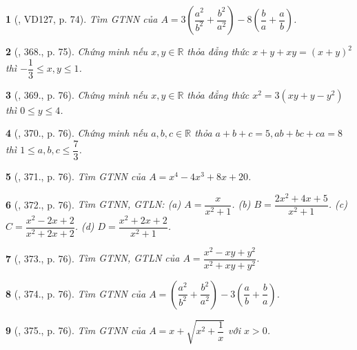 \documentclass{article}
\newtheorem{baitoan}{}
\begin{document}
\begin{baitoan}[\cite{Binh_Toan_9_tap_2}, VD127, p. 74]
	Tìm {\rm GTNN} của $A = 3\left(\dfrac{a^2}{b^2} + \dfrac{b^2}{a^2}\right) - 8\left(\dfrac{b}{a} + \dfrac{a}{b}\right)$.
\end{baitoan}

\begin{baitoan}[\cite{Binh_Toan_9_tap_2}, 368., p. 75]
	Chứng minh nếu $x,y\in\mathbb{R}$ thỏa đẳng thức $x + y + xy = (x + y)^2$ thì $-\dfrac{1}{3}\le x,y\le1$.
\end{baitoan}

\begin{baitoan}[\cite{Binh_Toan_9_tap_2}, 369., p. 76]
	Chứng minh nếu $x,y\in\mathbb{R}$ thỏa đẳng thức $x^2 = 3(xy + y - y^2)$ thì $0\le y\le4$.
\end{baitoan}

\begin{baitoan}[\cite{Binh_Toan_9_tap_2}, 370., p. 76]
	Chứng minh nếu $a,b,c\in\mathbb{R}$ thỏa $a + b + c = 5,ab + bc + ca = 8$ thì $1\le a,b,c\le\dfrac{7}{3}$.
\end{baitoan}

\begin{baitoan}[\cite{Binh_Toan_9_tap_2}, 371., p. 76]
	Tìm {\rm GTNN} của $A = x^4 - 4x^3 + 8x + 20$.
\end{baitoan}

\begin{baitoan}[\cite{Binh_Toan_9_tap_2}, 372., p. 76]
	Tìm {\rm GTNN, GTLN}: (a) $A = \dfrac{x}{x^2 + 1}$. (b) $B = \dfrac{2x^2 + 4x + 5}{x^2 + 1}$. (c) $C = \dfrac{x^2 - 2x + 2}{x^2 + 2x + 2}$. (d) $D = \dfrac{x^2 + 2x + 2}{x^2 + 1}$.
\end{baitoan}

\begin{baitoan}[\cite{Binh_Toan_9_tap_2}, 373., p. 76]
	Tìm {\rm GTNN, GTLN} của $A = \dfrac{x^2 - xy + y^2}{x^2 + xy + y^2}$.
\end{baitoan}

\begin{baitoan}[\cite{Binh_Toan_9_tap_2}, 374., p. 76]
	Tìm {\rm GTNN} của $A = \left(\dfrac{a^2}{b^2} + \dfrac{b^2}{a^2}\right) - 3\left(\dfrac{a}{b} + \dfrac{b}{a}\right)$.
\end{baitoan}

\begin{baitoan}[\cite{Binh_Toan_9_tap_2}, 375., p. 76]
	Tìm {\rm GTNN} của $A = x + \sqrt{x^2 + \dfrac{1}{x}}$ với $x > 0$.
\end{baitoan}
\end{document}
